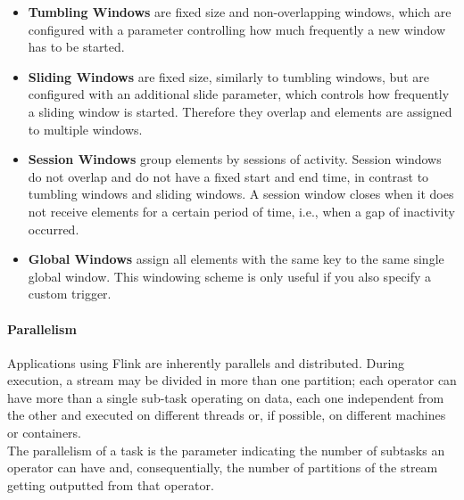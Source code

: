\begin{itemize}
    \item \textbf{Tumbling Windows} are fixed size and non-overlapping windows, which are configured with a parameter controlling how much frequently a new window has to be started.
    \item \textbf{Sliding Windows} are fixed size, similarly to tumbling windows, but are configured with an additional slide parameter, which controls how frequently a sliding window is started. Therefore they overlap and elements are assigned to multiple windows.
    \item \textbf{Session Windows} group elements by sessions of activity. Session windows do not overlap and do not have a fixed start and end time, in contrast to tumbling windows and sliding windows. A session window closes when it does not receive elements for a certain period of time, i.e., when a gap of inactivity occurred.
    \item \textbf{Global Windows} assign all elements with the same key to the same single global window. This windowing scheme is only useful if you also specify a custom trigger. 
\end{itemize}



\paragraph{Parallelism} \label{ParallelismFlink}

Applications using Flink are inherently parallels and distributed. During execution, a stream may be divided in more than one partition; each operator can have more than a single sub-task operating on data, each one independent from the other and executed on different threads or, if possible, on different machines or containers.\\
The parallelism of a task is the parameter indicating the number of subtasks an operator can have and, consequentially, the number of partitions of the stream getting outputted from that operator.\\

